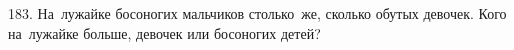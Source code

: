 183. На лужайке босоногих мальчиков столько же, сколько обутых девочек. Кого на лужайке больше, девочек или босоногих детей?\\
